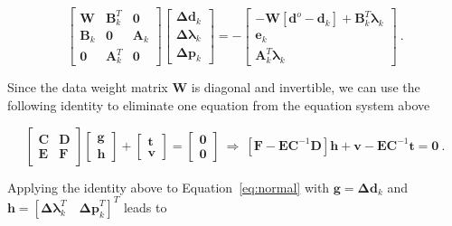 \begin{equation}
    \begin{bmatrix}
      \mathbf{W} & \mathbf{B}_k^T & \mathbf{0} \\
      \mathbf{B}_k & \mathbf{0} & \mathbf{A}_k \\
      \mathbf{0} & \mathbf{A}_k^T & \mathbf{0}
    \end{bmatrix}
  \begin{bmatrix}
    \mathbf{\Delta d}_k \\
    \boldsymbol{\Delta\lambda}_k \\
    \mathbf{\Delta p}_k
  \end{bmatrix}
  = -
    \begin{bmatrix}
      -\mathbf{W}\left[\mathbf{d}^o - \mathbf{d}_k\right] + \mathbf{B}_k^T\boldsymbol{\lambda}_k
      \\
      \mathbf{e}_k
      \\
      \mathbf{A}_k^T\boldsymbol{\lambda}_k
    \end{bmatrix}
  \ .
  \label{eq:normal}
\end{equation}

Since the data weight matrix $\mathbf{W}$ is diagonal and invertible, we can
use the following identity to eliminate one equation from the equation system
above \citep{WellsKrakiwsky1971}

\begin{equation}
    \begin{bmatrix}
      \mathbf{C} & \mathbf{D} \\
      \mathbf{E} & \mathbf{F}
    \end{bmatrix}
    \begin{bmatrix}
      \mathbf{g} \\
      \mathbf{h}
    \end{bmatrix}
    +
    \begin{bmatrix}
      \mathbf{t}
      \\
      \mathbf{v}
    \end{bmatrix}
    =
    \begin{bmatrix}
      \mathbf{0}
      \\
      \mathbf{0}
    \end{bmatrix}
    \ \Rightarrow \
    \left[\mathbf{F} - \mathbf{E}\mathbf{C}^{-1}\mathbf{D}\right]\mathbf{h}
    + \mathbf{v} - \mathbf{E}\mathbf{C}^{-1}\mathbf{t} = \mathbf{0}
  \ .
  \label{eq:identity}
\end{equation}

Applying the identity above to Equation~\ref{eq:normal} with
$\mathbf{g} = \mathbf{\Delta d}_k$ and
$\mathbf{h} = \left[\boldsymbol{\Delta\lambda}_k^T \quad \mathbf{\Delta p}_k^T\right]^T$
leads to

